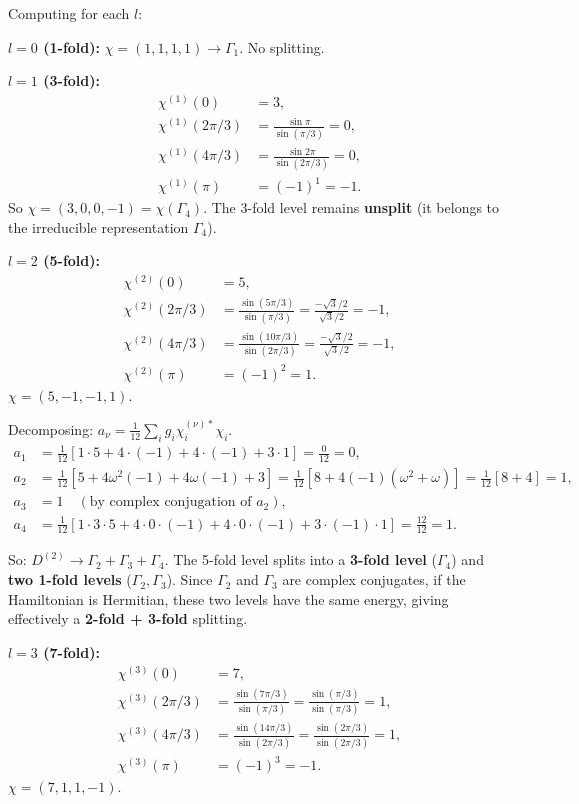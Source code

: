 \documentclass[12pt]{article}
\begin{document}
Computing for each $l$:

\noindent\textbf{$l = 0$ (1-fold):} $\chi = (1, 1, 1, 1) \to \Gamma_1$. No splitting.

\noindent\textbf{$l = 1$ (3-fold):}
\begin{align*}
\chi^{(1)}(0) &= 3, \\
\chi^{(1)}(2\pi/3) &= \frac{\sin \pi}{\sin(\pi/3)} = 0, \\
\chi^{(1)}(4\pi/3) &= \frac{\sin 2\pi}{\sin(2\pi/3)} = 0, \\
\chi^{(1)}(\pi) &= (-1)^1 = -1.
\end{align*}
So $\chi = (3, 0, 0, -1) = \chi(\Gamma_4)$. The 3-fold level remains \textbf{unsplit} (it belongs to the irreducible representation $\Gamma_4$).

\noindent\textbf{$l = 2$ (5-fold):}
\begin{align*}
\chi^{(2)}(0) &= 5, \\
\chi^{(2)}(2\pi/3) &= \frac{\sin(5\pi/3)}{\sin(\pi/3)} = \frac{-\sqrt{3}/2}{\sqrt{3}/2} = -1, \\
\chi^{(2)}(4\pi/3) &= \frac{\sin(10\pi/3)}{\sin(2\pi/3)} = \frac{-\sqrt{3}/2}{\sqrt{3}/2} = -1, \\
\chi^{(2)}(\pi) &= (-1)^2 = 1.
\end{align*}
$\chi = (5, -1, -1, 1)$.

Decomposing: $a_\nu = \frac{1}{12}\sum_i g_i \chi_i^{(\nu)*}\chi_i$.
\begin{align*}
a_1 &= \frac{1}{12}[1\cdot 5 + 4\cdot(-1) + 4\cdot(-1) + 3\cdot 1] = \frac{0}{12} = 0, \\
a_2 &= \frac{1}{12}[5 + 4\omega^2(-1) + 4\omega(-1) + 3] = \frac{1}{12}[8 + 4(-1)(\omega^2 + \omega)] = \frac{1}{12}[8 + 4] = 1, \\
a_3 &= 1 \quad (\text{by complex conjugation of } a_2), \\
a_4 &= \frac{1}{12}[1\cdot 3\cdot 5 + 4\cdot 0\cdot(-1) + 4\cdot 0\cdot(-1) + 3\cdot(-1)\cdot 1] = \frac{12}{12} = 1.
\end{align*}

So: $D^{(2)} \to \Gamma_2 + \Gamma_3 + \Gamma_4$. The 5-fold level splits into a \textbf{3-fold level} ($\Gamma_4$) and \textbf{two 1-fold levels} ($\Gamma_2, \Gamma_3$). Since $\Gamma_2$ and $\Gamma_3$ are complex conjugates, if the Hamiltonian is Hermitian, these two levels have the same energy, giving effectively a \textbf{2-fold + 3-fold} splitting.

\noindent\textbf{$l = 3$ (7-fold):}
\begin{align*}
\chi^{(3)}(0) &= 7, \\
\chi^{(3)}(2\pi/3) &= \frac{\sin(7\pi/3)}{\sin(\pi/3)} = \frac{\sin(\pi/3)}{\sin(\pi/3)} = 1, \\
\chi^{(3)}(4\pi/3) &= \frac{\sin(14\pi/3)}{\sin(2\pi/3)} = \frac{\sin(2\pi/3)}{\sin(2\pi/3)} = 1, \\
\chi^{(3)}(\pi) &= (-1)^3 = -1.
\end{align*}
$\chi = (7, 1, 1, -1)$.
\end{document}
